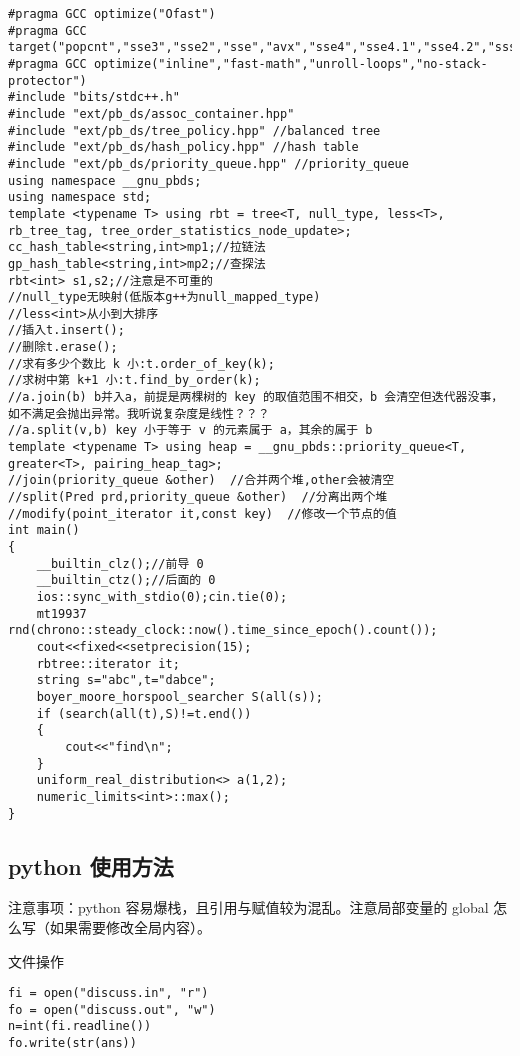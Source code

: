 \documentclass[12pt]{ctexart}
\begin{document}
\begin{lstlisting}
#pragma GCC optimize("Ofast")
#pragma GCC target("popcnt","sse3","sse2","sse","avx","sse4","sse4.1","sse4.2","ssse3","f16c","fma","avx2","xop","fma4")
#pragma GCC optimize("inline","fast-math","unroll-loops","no-stack-protector")
#include "bits/stdc++.h"
#include "ext/pb_ds/assoc_container.hpp"
#include "ext/pb_ds/tree_policy.hpp" //balanced tree
#include "ext/pb_ds/hash_policy.hpp" //hash table
#include "ext/pb_ds/priority_queue.hpp" //priority_queue
using namespace __gnu_pbds;
using namespace std;
template <typename T> using rbt = tree<T, null_type, less<T>, rb_tree_tag, tree_order_statistics_node_update>;
cc_hash_table<string,int>mp1;//拉链法
gp_hash_table<string,int>mp2;//查探法
rbt<int> s1,s2;//注意是不可重的
//null_type无映射(低版本g++为null_mapped_type)
//less<int>从小到大排序
//插入t.insert();
//删除t.erase();
//求有多少个数比 k 小:t.order_of_key(k);
//求树中第 k+1 小:t.find_by_order(k);
//a.join(b) b并入a，前提是两棵树的 key 的取值范围不相交，b 会清空但迭代器没事，如不满足会抛出异常。我听说复杂度是线性？？？
//a.split(v,b) key 小于等于 v 的元素属于 a，其余的属于 b
template <typename T> using heap = __gnu_pbds::priority_queue<T, greater<T>, pairing_heap_tag>;
//join(priority_queue &other)  //合并两个堆,other会被清空
//split(Pred prd,priority_queue &other)  //分离出两个堆
//modify(point_iterator it,const key)  //修改一个节点的值
int main()
{
    __builtin_clz();//前导 0
    __builtin_ctz();//后面的 0
	ios::sync_with_stdio(0);cin.tie(0);
	mt19937 rnd(chrono::steady_clock::now().time_since_epoch().count());
    cout<<fixed<<setprecision(15);
	rbtree::iterator it;
	string s="abc",t="dabce";
	boyer_moore_horspool_searcher S(all(s));
	if (search(all(t),S)!=t.end())
	{
		cout<<"find\n";
	}
    uniform_real_distribution<> a(1,2);
	numeric_limits<int>::max();
}
\end{lstlisting}

\subsection{python 使用方法}

注意事项：python 容易爆栈，且引用与赋值较为混乱。注意局部变量的 global 怎么写（如果需要修改全局内容）。

文件操作

\begin{lstlisting}
fi = open("discuss.in", "r")
fo = open("discuss.out", "w")
n=int(fi.readline())
fo.write(str(ans))
\end{lstlisting}
\end{document}
